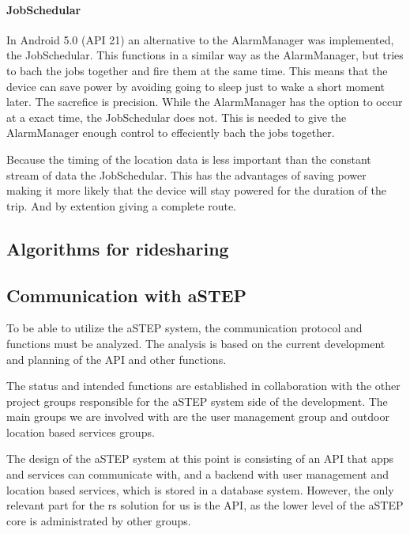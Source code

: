 \paragraph{JobSchedular}
In Android 5.0 (API 21) an alternative to the AlarmManager was implemented, the JobSchedular.
This functions in a similar way as the AlarmManager, but tries to bach the jobs together and fire them at the same time.
This means that the device can save power by avoiding going to sleep just to wake a short moment later.
The sacrefice is precision. 
While the AlarmManager has the option to occur at a exact time, the JobSchedular does not.
This is needed to give the AlarmManager enough control to effeciently bach the jobs together.

 Because the timing of the location data is less important than the constant stream of data the JobSchedular.
This has the advantages of saving power making it more likely that the device will stay powered for the duration of the trip.
And by extention giving a complete route.

\subsection{Algorithms for ridesharing}


\subsection{Communication with aSTEP}\label{ssec:communicationwithastep}
To be able to utilize the aSTEP system, the communication protocol and functions must be analyzed. 
The analysis is based on the current development and planning of the API and other functions.

The status and intended functions are established in collaboration with the other project groups responsible for the aSTEP system side of the development. 
The main groups we are involved with are the user management group and outdoor location based services groups.

The design of the aSTEP system at this point is consisting of an API that apps and services can communicate with, and a backend with user management and location based services, which is stored in a database system.
However, the only relevant part for the \gls{rs} solution for us is the API, as the lower level of the aSTEP core is administrated by other groups.

